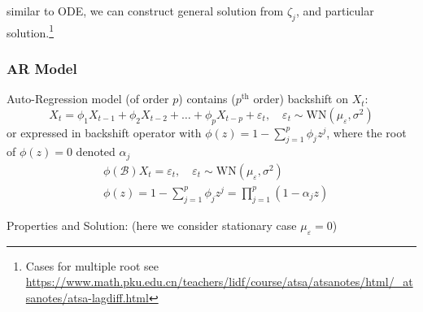     similar to ODE, we can construct general solution from $ \zeta _j $, and particular solution.\footnote{Cases for multiple root see \url{https://www.math.pku.edu.cn/teachers/lidf/course/atsa/atsanotes/html/_atsanotes/atsa-lagdiff.html}}

\subsubsection{AR Model}
    Auto-Regression model (of order $ p $) contains ($ p^\mathrm{th} $ order) backshift on $ X_t $:
    \begin{equation}
        X_t=\phi _1X_{t-1}+\phi _2X_{t-2}+\ldots+\phi _pX_{t-p}+\varepsilon _t,\quad \varepsilon _t\sim \mathrm{WN}(\mu_\varepsilon  ,\sigma ^2)  
    \end{equation}
    or expressed in backshift operator with $ \phi (z)=1-\sum_{j=1}^p\phi _jz^j $, where the root of $ \phi (z)=0 $ denoted $ \alpha _j $
    \begin{align*}
        &\phi (\mathscr{B} )X_t=\varepsilon _t,\quad\varepsilon _t\sim \mathrm{WN}(\mu_\varepsilon  ,\sigma ^2)   \\
        &\phi (z)=1-\sum_{j=1}^p\phi _jz^j=\prod_{j=1}^p(1-\alpha _jz)
    \end{align*}

\begin{point}
    Properties and Solution: (here we consider stationary case $ \mu_\varepsilon  =0 $)
\end{point}

